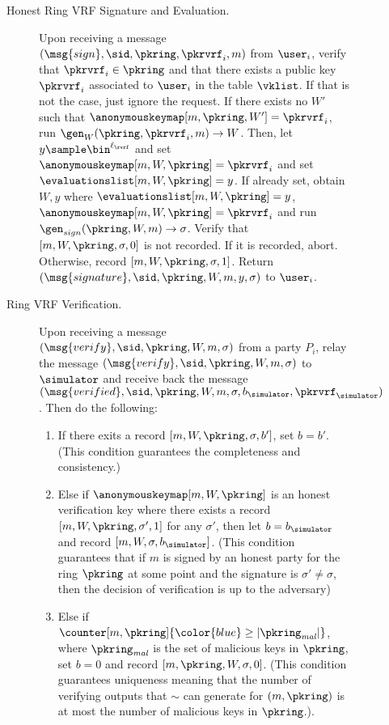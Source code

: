 \begin{figure}
\begin{tcolorbox}
{\begin{description}
		     	\item[Honest Ring VRF Signature {\color{blue}and Evaluation.}] Upon receiving a message $(\msg{sign}, \sid, \pkring, \pkrvrf_i, m)$ from $\user_i$, verify that $\pkrvrf_i \in \pkring$ and that there exists a public key $\pkrvrf_i$ associated to $\user_i$ in the table $ \vklist $. If that is not the case, just ignore the request. 	
				If there exists no $ W' $ such that $ \anonymouskeymap[m, \pkring,W'] =  \pkrvrf_i $, run $ \gen_W(\pkring, \pkrvrf_i, m) \rightarrow W$. Then, let $y \sample \bin^{\ell_\rvrf}$ and set $ \anonymouskeymap[m,W,\pkring] = \pkrvrf_i $ and set $ \evaluationslist[m, W,\pkring] = y$.
				If already set, obtain $ W, y $ where  $ \evaluationslist[m, W, \pkring] = y$, $ \anonymouskeymap[m,W,\pkring] =\pkrvrf_i $ and run  $ \gen_{sign}(\pkring, W, m) \rightarrow \sigma $. Verify that $ [m, W,\pkring, \sigma, 0] $ is not recorded. {\color{blue}If it is recorded}, abort. 
				Otherwise, record $ [m, W, \pkring,\sigma, 1] $. Return $(\msg{signature}, \sid, \pkring,W,m, y, \sigma)$ to $\user_i$.
				
				\item[Ring VRF Verification.] Upon receiving a message $(\msg{verify}, \sid, \pkring,W, m, \sigma)$ from a party $P_i$, relay the message $(\msg{verify}, \sid, \pkring,W, m, \sigma)$ to $ \simulator $ and receive back the message $(\msg{verified}, \sid, \pkring,W, m, \sigma, b_{\simulator}, \pkrvrf_\simulator)$. Then do the following: 
				\begin{enumerate}[label={{Cond.-} }{{\arabic*}}, start = 1]
					\item If there exits a record $ [m,W,\pkring,\sigma, b'] $, set $ b = b' $. (This condition guarantees the completeness and consistency.)
					\label{cond:consistency}
					\item Else if $ \anonymouskeymap[m,W,\pkring]  $ is an honest verification key where  there exists a record $ [m, W,\pkring, \sigma', 1] $ for any $ \sigma' $, then let $ b= b_{\simulator} $ and record $ [m, W,\sigma, b_{\simulator}] $. (This condition guarantees that if $ m $ is signed by an honest party for the ring $ \pkring $ at some point and the signature is $ \sigma' \neq \sigma $, then the decision of verification is up to the adversary) \label{cond:differentsignature}
					
					\item Else if $\counter[m, \pkring] {\color{blue}\geq |\pkring_{\mathit{mal}}|}$, where {\color{blue} $\pkring_{\mathit{mal}}$} is the set of {\color{blue} malicious} keys in $ \pkring $, set $ b = 0 $ and record $ [m, \pkring,W,\sigma, 0] $.
					(This condition guarantees  uniqueness meaning that the number of {\color{blue} verifying} outputs that $ \sim $ can generate for $(m, \pkring)$ 
					is at most the  number of malicious keys in $ \pkring $.)\label{cond:uniqueness}.
					

\end{enumerate}
\end{description}}
\end{tcolorbox}
\end{figure}

